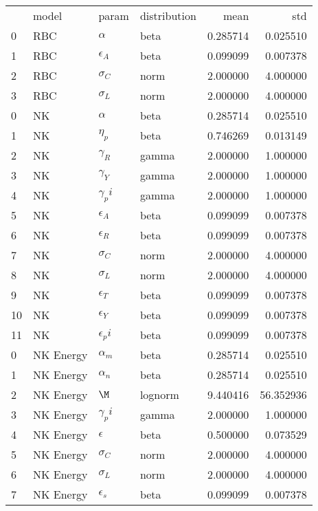 \begin{tabular}{llllrr}
 & model & param & distribution & mean & std \\
0 & RBC & $\alpha$ & beta & 0.285714 & 0.025510 \\
1 & RBC & $\epsilon_A$ & beta & 0.099099 & 0.007378 \\
2 & RBC & $\sigma_C$ & norm & 2.000000 & 4.000000 \\
3 & RBC & $\sigma_L$ & norm & 2.000000 & 4.000000 \\
0 & NK & $\alpha$ & beta & 0.285714 & 0.025510 \\
1 & NK & $\eta_p$ & beta & 0.746269 & 0.013149 \\
2 & NK & $\gamma_R$ & gamma & 2.000000 & 1.000000 \\
3 & NK & $\gamma_Y$ & gamma & 2.000000 & 1.000000 \\
4 & NK & $\gamma_pi$ & gamma & 2.000000 & 1.000000 \\
5 & NK & $\epsilon_A$ & beta & 0.099099 & 0.007378 \\
6 & NK & $\epsilon_R$ & beta & 0.099099 & 0.007378 \\
7 & NK & $\sigma_C$ & norm & 2.000000 & 4.000000 \\
8 & NK & $\sigma_L$ & norm & 2.000000 & 4.000000 \\
9 & NK & $\epsilon_T$ & beta & 0.099099 & 0.007378 \\
10 & NK & $\epsilon_Y$ & beta & 0.099099 & 0.007378 \\
11 & NK & $\epsilon_pi$ & beta & 0.099099 & 0.007378 \\
0 & NK Energy & $\alpha_m$ & beta & 0.285714 & 0.025510 \\
1 & NK Energy & $\alpha_n$ & beta & 0.285714 & 0.025510 \\
2 & NK Energy & $\M$ & lognorm & 9.440416 & 56.352936 \\
3 & NK Energy & $\gamma_pi$ & gamma & 2.000000 & 1.000000 \\
4 & NK Energy & $\epsilon$ & beta & 0.500000 & 0.073529 \\
5 & NK Energy & $\sigma_C$ & norm & 2.000000 & 4.000000 \\
6 & NK Energy & $\sigma_L$ & norm & 2.000000 & 4.000000 \\
7 & NK Energy & $\epsilon_s$ & beta & 0.099099 & 0.007378 \\
\end{tabular}